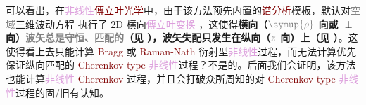 可以看出，在\textcolor{Plum}{非线性}\textcolor{Maroon}{傅立叶光学}中，由于该方法预先内置的\textcolor{Maroon}{谱分析}模板，默认对\textcolor{gray}{空域}三维波动方程  执行了 2D 横向\textcolor{Plum}{傅立叶变换} ，这使得\textbf{横向（$\mathcolor{gray}{\symup{\rho}}$ 向或 $\perp$ 向）\textcolor{gray}{波矢总是守恒、匹配的}（见 ），\textcolor{PineGreen}{波矢失配}只发生在纵向（$\mathcolor{gray}{z}$ 向）上（见 ）}。这使得看上去只能计算 \textcolor{Maroon}{Bragg} 或 \textcolor{Maroon}{Raman-Nath} 衍射型\textcolor{Plum}{非线性}过程，而无法计算优先保证\textcolor{PineGreen}{纵向匹配}的 \textcolor{Maroon}{Cherenkov-type} \textcolor{Plum}{非线性}过程？不是的。后面我们会证明，该方法也能计算\textcolor{Plum}{非线性} \textcolor{Maroon}{Cherenkov} 过程，并且会打破众所周知的对 \textcolor{Maroon}{Cherenkov-type} \textcolor{Plum}{非线性}过程的固/旧有认知。

